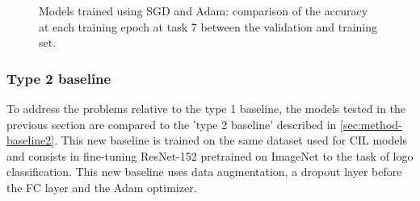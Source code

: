 \begin{figure}[H]
	\centering
    \qquad
	\caption{Models trained using SGD and Adam: comparison of the accuracy at each training epoch at task 7 between the validation and training set.}%
	\label{fig:exp4-train_val}%
\end{figure}

\newpage


\newpage
\subsubsection{Type 2 baseline}
To address the problems relative to the type 1 baseline, the models tested in the previous section are compared to the 'type 2 baseline' described in \autoref{sec:method-baseline2}. This new baseline is trained on the same dataset used for CIL models and consists in fine-tuning ResNet-152 pretrained on ImageNet to the task of logo classification. This new baseline uses data augmentation, a dropout layer before the FC layer and the Adam optimizer.

